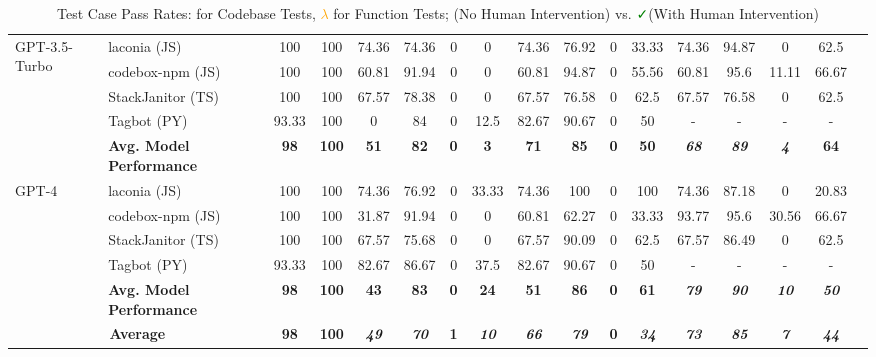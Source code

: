 \begin{table*}[htb!]
\begin{tabular}{|l|l|c|c|c|c|c|c|c|c|c|c|c|c|c|c|c|}
        \hline
        \multirow{5}{*}{GPT-3.5-Turbo} & laconia (JS) & 100 & 100 & 74.36 & 74.36 & 0 & 0 & 74.36 & 76.92 & 0 & 33.33 & 74.36 & 94.87 & 0 & 62.5 \\
        \cline{2-16}
        & codebox-npm (JS) & 100 & 100 & 60.81 & 91.94 & 0 & 0 & 60.81 & 94.87 & 0 & 55.56 & 60.81 & 95.6 & 11.11 & 66.67 \\
        \cline{2-16}
        & StackJanitor (TS) & 100 & 100 & 67.57 & 78.38 & 0 & 0 & 67.57 & 76.58 & 0 & 62.5 & 67.57 & 76.58 & 0 & 62.5 \\
        \cline{2-16}
        & Tagbot (PY) & 93.33 & 100 & 0 & 84 & 0 & 12.5 & 82.67 & 90.67 & 0 & 50 & - & - & - & -\\
        \cline{2-16}
        & \textbf{Avg. Model Performance} & \textbf{98} & \textbf{100} & \textbf{51} & \textbf{82} & \textbf{0} & \textbf{3} & \textbf{71} & \textbf{85} & \textbf{0} & \textbf{50} & \textit{\textbf{68}} & \textit{\textbf{89}} & \textit{\textbf{4}} & \textbf{64}\\
        \hline
        \multirow{4}{*}{GPT-4} & laconia (JS) & 100 & 100 & 74.36 & 76.92 & 0 & 33.33 & 74.36 & 100 & 0 & 100 & 74.36 & 87.18 & 0 & 20.83 \\
        \cline{2-16}
        & codebox-npm (JS) & 100 & 100 & 31.87 & 91.94 & 0 & 0 & 60.81 & 62.27 & 0 & 33.33 & 93.77 & 95.6 & 30.56 & 66.67 \\
        \cline{2-16}
        & StackJanitor (TS) & 100 & 100 & 67.57 & 75.68 & 0 & 0 & 67.57 & 90.09 & 0 & 62.5 & 67.57 & 86.49 & 0 & 62.5 \\
        \cline{2-16}
        & Tagbot (PY) & 93.33 & 100 & 82.67 & 86.67 & 0 & 37.5 & 82.67 & 90.67 & 0 & 50 & - & - & - & -\\
        \cline{2-16}
        & \textbf{Avg. Model Performance} & \textbf{98} & \textbf{100} & \textbf{43} & \textbf{83} & \textbf{0} & \textbf{24} & \textbf{51} & \textbf{86} & \textbf{0} & \textbf{61} & \textit{\textbf{79}} & \textit{\textbf{90}} & \textit{\textbf{10}} & \textit{\textbf{50}}\\
        \hline
        \multicolumn{2}{|c|}{\textbf{Average}} & \textbf{98} & \textbf{100} & \textit{\textbf{49}} & \textit{\textbf{70}} & \textbf{1} & \textit{\textbf{10}} & \textit{\textbf{66}} & \textit{\textbf{79}} & \textbf{0} & \textit{\textbf{34}} & \textit{\textbf{73}} & \textit{\textbf{85}} & \textit{\textbf{7}} & \textit{\textbf{44}}\\
        \hline
    \end{tabular}
    \vspace{2mm}
    \caption{Test Case Pass Rates:  for Codebase Tests, \textbf{\textcolor{orange}{$\lambda$}} for Function Tests; \faUser\textcolor{red}{\faTimes}(No Human Intervention) vs. \faUser\textcolor{green}{\faCheck}(With Human Intervention)}
    \label{table:RQ1-table}
    \vspace{-18pt}
\end{table*}

